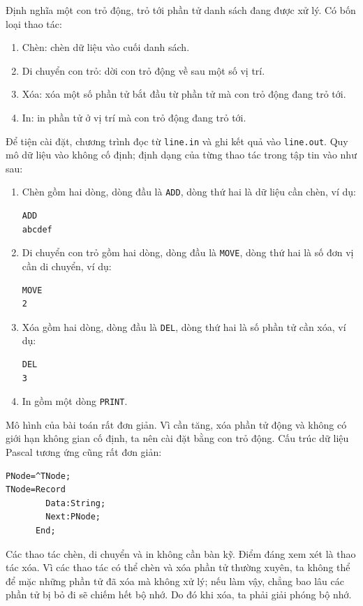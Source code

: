 \documentclass[11pt]{article}
\begin{document}
Định nghĩa một con trỏ động, trỏ tới phần tử danh sách đang được xử lý. Có
bốn loại thao tác:
\begin{enumerate}
  \item Chèn: chèn dữ liệu vào cuối danh sách.
  \item Di chuyển con trỏ: dời con trỏ động về sau một số vị trí.
  \item Xóa: xóa một số phần tử bắt đầu từ phần tử mà con trỏ động đang trỏ
  tới.
  \item In: in phần tử ở vị trí mà con trỏ động đang trỏ tới.
\end{enumerate}

Để tiện cài đặt, chương trình đọc từ \texttt{line.in} và ghi kết quả vào
\texttt{line.out}. Quy mô dữ liệu vào không cố định; định dạng của từng thao
tác trong tập tin vào như sau:
\begin{enumerate}
  \item Chèn gồm hai dòng, dòng đầu là \texttt{ADD}, dòng thứ hai là dữ liệu
  cần chèn, ví dụ:
\begin{verbatim}
ADD
abcdef
\end{verbatim}
  \item Di chuyển con trỏ gồm hai dòng, dòng đầu là \texttt{MOVE}, dòng thứ
  hai là số đơn vị cần di chuyển, ví dụ:
\begin{verbatim}
MOVE
2
\end{verbatim}
  \item Xóa gồm hai dòng, dòng đầu là \texttt{DEL}, dòng thứ hai là số phần
  tử cần xóa, ví dụ:
\begin{verbatim}
DEL
3
\end{verbatim}
  \item In gồm một dòng \texttt{PRINT}.
\end{enumerate}

Mô hình của bài toán rất đơn giản. Vì cần tăng, xóa phần tử động và không có
giới hạn không gian cố định, ta nên cài đặt bằng con trỏ động. Cấu trúc dữ
liệu Pascal tương ứng cũng rất đơn giản:
\begin{verbatim}
PNode=^TNode;
TNode=Record
        Data:String;
        Next:PNode;
      End;
\end{verbatim}

Các thao tác chèn, di chuyển và in không cần bàn kỹ. Điểm đáng xem xét là
thao tác xóa. Vì các thao tác có thể chèn và xóa phần tử thường xuyên, ta
không thể để mặc những phần tử đã xóa mà không xử lý; nếu làm vậy, chẳng bao
lâu các phần tử bị bỏ đi sẽ chiếm hết bộ nhớ. Do đó khi xóa, ta phải giải
phóng bộ nhớ.
\end{document}
